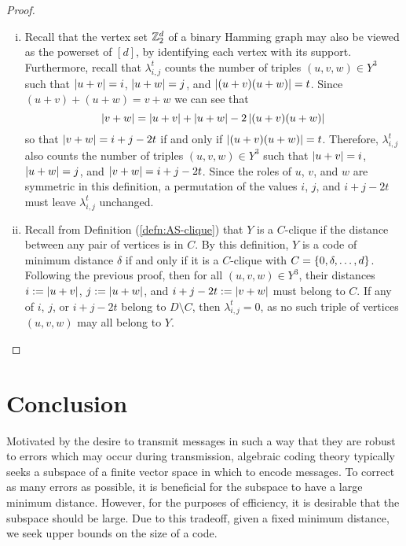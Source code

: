 \documentclass{report}
\newcommand{\wt}[1]{\abs{ #1 }}
\newcommand{\lijt}{\lambda_{i, j}^t}
\begin{document}
\begin{proof}
\begin{enumerate}[(i)]
      \item Recall that the vertex set $\mathbb{Z}_2^d$ of a binary Hamming graph may
        also be viewed as the powerset of $[d]$, by identifying each vertex with
        its support.  Furthermore, recall that $\lijt$ counts the number of
        triples $(u, v, w) \in Y^3$ such that $\wt{u + v} = i$, $\wt{u + w} =
        j$, and $\wt{(u + v)(u + w)} = t$.  Since $(u + v) + (u + w) = v + w$
        we can see that
        $$
          \wt{v + w} = \wt{u + v} + \wt{u + w} - 2\wt{(u + v)(u + w)}
        $$
        so that $\wt{v + w} = i + j - 2t$ if and only if $\wt{(u + v)(u + w)} =
        t$.  Therefore, $\lijt$ also counts the number of triples $(u, v, w) \in
        Y^3$ such that $\wt{u + v} = i$, $\wt{u + w} = j$, and $\wt{v + w} = i +
        j - 2t$.  Since the roles of $u$, $v$, and $w$ are symmetric in this
        definition, a permutation of the values $i$, $j$, and $i + j - 2t$ must
        leave $\lijt$ unchanged.

      \item Recall from Definition (\ref{defn:AS-clique}) that $Y$ is a
        $C$-clique if the distance between any pair of vertices is in $C$.  By
        this definition, $Y$ is a code of minimum distance $\delta$ if and only
        if it is a $C$-clique with $C = \left\lbrace 0, \delta, \ldots, d \right\rbrace$.  Following
        the previous proof, then for all $(u, v, w) \in Y^3$, their distances
        $i := \wt{u + v}$, $j := \wt{u + w}$, and $i + j - 2t := \wt{v + w}$
        must belong to $C$.  If any of $i$, $j$, or $i + j - 2t$ belong to $D
        \setminus C$, then $\lijt = 0$, as no such triple of vertices $(u, v,
        w)$ may all belong to $Y$.

    \end{enumerate} \end{proof}

\chapter{Conclusion}

  Motivated by the desire to transmit messages in such a way that they are
  robust to errors which may occur during transmission, algebraic coding theory
  typically seeks a subspace of a finite vector space in which to encode
  messages.  To correct as many errors as possible, it is beneficial for the
  subspace to have a large minimum distance.  However, for the purposes of
  efficiency, it is desirable that the subspace should be large.  Due to this
  tradeoff, given a fixed minimum distance, we seek upper bounds on the size of
  a code.
\end{document}
